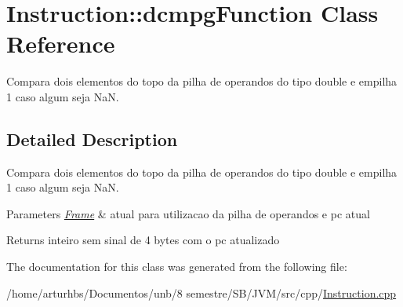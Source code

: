\hypertarget{classInstruction_1_1dcmpgFunction}{}\section{Instruction\+:\+:dcmpg\+Function Class Reference}
\label{classInstruction_1_1dcmpgFunction}


Compara dois elementos do topo da pilha de operandos do tipo double e empilha 1 caso algum seja NaN.  




\subsection{Detailed Description}
Compara dois elementos do topo da pilha de operandos do tipo double e empilha 1 caso algum seja NaN. 


\begin{DoxyParams}{Parameters}
{\em \hyperlink{classFrame}{Frame}} & atual para utilizacao da pilha de operandos e pc atual \\
\hline
\end{DoxyParams}
\begin{DoxyReturn}{Returns}
inteiro sem sinal de 4 bytes com o pc atualizado 
\end{DoxyReturn}


The documentation for this class was generated from the following file\+:\begin{DoxyCompactItemize}
\item 
/home/arturhbs/\+Documentos/unb/8 semestre/\+S\+B/\+J\+V\+M/src/cpp/\hyperlink{Instruction_8cpp}{Instruction.\+cpp}\end{DoxyCompactItemize}

